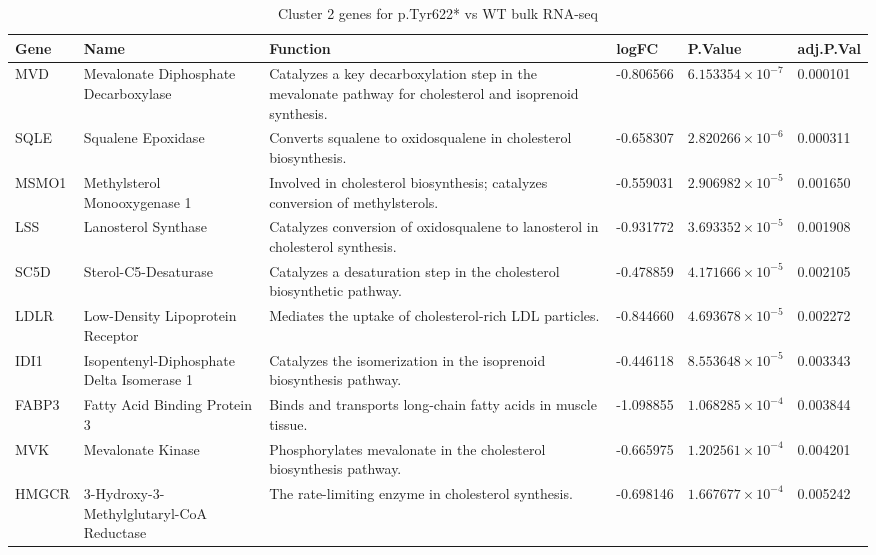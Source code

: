 \clearpage
\begin{longtable}{p{1.5cm} p{4cm} p{5cm} p{1.5cm} p{1.5cm} p{1.5cm}}
    \caption{Cluster 2 genes for p.Tyr622* vs WT bulk RNA-seq}
    \hline
    \textbf{Gene} & \textbf{Name} & \textbf{Function} & \textbf{logFC} & \textbf{P.Value} & \textbf{adj.P.Val} \\
    \hline
    \hline
    MVD    & Mevalonate Diphosphate Decarboxylase      & Catalyzes a key decarboxylation step in the mevalonate pathway for cholesterol and isoprenoid synthesis. & -0.806566 & $6.153354\times10^{-7}$ & 0.000101 \\
    \hline
    SQLE   & Squalene Epoxidase                       & Converts squalene to oxidosqualene in cholesterol biosynthesis.  & -0.658307 & $2.820266\times10^{-6}$ & 0.000311 \\
    \hline
    MSMO1  & Methylsterol Monooxygenase 1             & Involved in cholesterol biosynthesis; catalyzes conversion of methylsterols. & -0.559031 & $2.906982\times10^{-5}$ & 0.001650 \\
    \hline
    LSS    & Lanosterol Synthase                      & Catalyzes conversion of oxidosqualene to lanosterol in cholesterol synthesis.  & -0.931772 & $3.693352\times10^{-5}$ & 0.001908 \\
    \hline
    SC5D   & Sterol-C5-Desaturase                     & Catalyzes a desaturation step in the cholesterol biosynthetic pathway. & -0.478859 & $4.171666\times10^{-5}$ & 0.002105 \\
    \hline
    LDLR   & Low-Density Lipoprotein Receptor         & Mediates the uptake of cholesterol-rich LDL particles.  & -0.844660 & $4.693678\times10^{-5}$ & 0.002272 \\
    \hline
    IDI1   & Isopentenyl-Diphosphate Delta Isomerase 1 & Catalyzes the isomerization in the isoprenoid biosynthesis pathway.  & -0.446118 & $8.553648\times10^{-5}$ & 0.003343 \\
    \hline
    FABP3  & Fatty Acid Binding Protein 3             & Binds and transports long-chain fatty acids in muscle tissue.  & -1.098855 & $1.068285\times10^{-4}$ & 0.003844 \\
    \hline
    MVK    & Mevalonate Kinase                        & Phosphorylates mevalonate in the cholesterol biosynthesis pathway.  & -0.665975 & $1.202561\times10^{-4}$ & 0.004201 \\
    \hline
    HMGCR  & 3-Hydroxy-3-Methylglutaryl-CoA Reductase  & The rate-limiting enzyme in cholesterol synthesis.  & -0.698146 & $1.667677\times10^{-4}$ & 0.005242 \\

\end{longtable}
